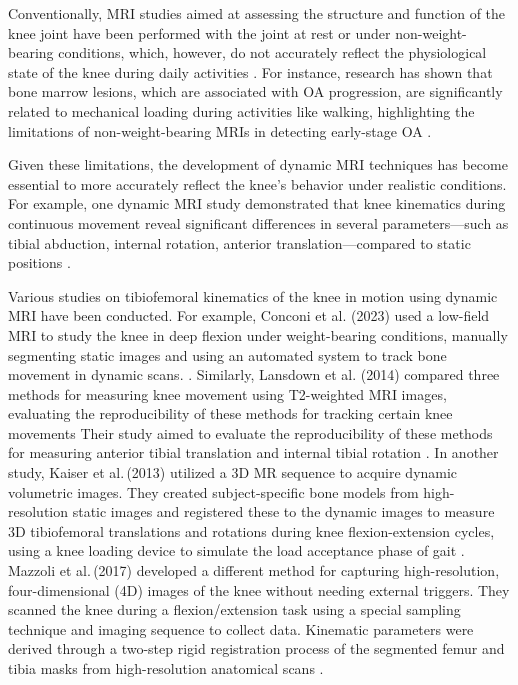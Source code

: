 \documentclass{micro-econ-thesis}
\begin{document}
Conventionally, MRI studies aimed at assessing the structure and function of the knee joint have been performed with the joint at rest or under non-weight-bearing conditions, which, however, do not accurately reflect the physiological state of the knee during daily activities \parencite{blankevoort_envelope_1988}. For instance, research has shown that bone marrow lesions, which are associated with OA progression, are significantly related to mechanical loading during activities like walking, highlighting the limitations of non-weight-bearing MRIs in detecting early-stage OA \parencite{bennell_bone_2010}. 

Given these limitations, the development of dynamic MRI techniques has become essential to more accurately reflect the knee's behavior under realistic conditions. For example, one dynamic MRI study demonstrated that knee kinematics during continuous movement reveal significant differences in several parameters---such as tibial abduction, internal rotation, anterior translation---compared to static positions \parencite{dentremont_dynamicbased_2013}. 

Various studies on tibiofemoral kinematics of the knee in motion using dynamic MRI have been conducted.  For example, Conconi et al. (2023) used a low-field MRI to study the knee in deep flexion under weight-bearing conditions, manually segmenting static images and using an automated system to track bone movement in dynamic scans. \parencite{conconi_-vivo_2023}. Similarly, Lansdown et al. (2014) compared three methods for measuring knee movement using T2-weighted MRI images, evaluating the reproducibility of these methods for tracking certain knee movements Their study aimed to evaluate the reproducibility of these methods for measuring anterior tibial translation and internal tibial rotation \parencite{lansdown_reproducibility_2015}. In another study, Kaiser et al.\,(2013) utilized a 3D MR sequence to acquire dynamic volumetric images. They created subject-specific bone models from high-resolution static images and registered these to the dynamic images to measure 3D tibiofemoral translations and rotations during knee flexion-extension cycles, using a knee loading device to simulate the load acceptance phase of gait \parencite{kaiser_measurement_2013}. Mazzoli et al.\,(2017) developed a different method for capturing high-resolution, four-dimensional (4D) images of the knee without needing external triggers. They scanned the knee during a flexion/extension task using a special sampling technique and imaging sequence to collect data. Kinematic parameters were derived through a two-step rigid registration process of the segmented femur and tibia masks from high-resolution anatomical scans \parencite{mazzoli_accelerated_2017}.
\end{document}
